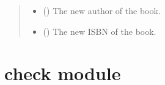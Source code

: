 \documentclass[letterpaper,10pt,english,openany,oneside]{sphinxmanual}
\begin{document}
\begin{fulllineitems}
\begin{fulllineitems}
\begin{quote}
\begin{description}
\begin{itemize}
\item {} 
\sphinxAtStartPar
{} (\sphinxstyleliteralemphasis{\sphinxupquote{, }}) \textendash{} The new author of the book.

\item {} 
\sphinxAtStartPar
{} (\sphinxstyleliteralemphasis{\sphinxupquote{, }}) \textendash{} The new ISBN of the book.

\end{itemize}

\end{description}\end{quote}

\end{fulllineitems}


\end{fulllineitems}


\sphinxstepscope


\section{check module}
\label{\detokenize{check:module-check}}\label{\detokenize{check:check-module}}\label{\detokenize{check::doc}}
\end{document}
